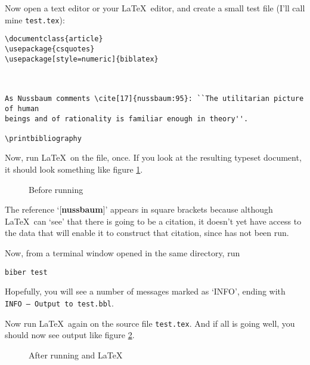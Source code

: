 Now open a text editor or your \LaTeX\ editor, and create a small test file (I'll call mine \texttt{test.tex}):

\begin{verbatim}
\documentclass{article}
\usepackage{csquotes}
\usepackage[style=numeric]{biblatex}



As Nussbaum comments \cite[17]{nussbaum:95}: ``The utilitarian picture of human
beings and of rationality is familiar enough in theory''.

\printbibliography

\end{verbatim}

Now, run \LaTeX\ on the file, once. If you look at the resulting typeset document, it should look something like figure \ref{nussbaum1}.

\begin{figure}
\caption{Before running }\label{nussbaum1}
\end{figure}

The reference `[\textbf{nussbaum}]' appears in square brackets because although \LaTeX\ can `see' that there is going to be a citation, it doesn't yet have access to the data that will enable it to construct that citation, since  has not been run.

Now, from a terminal window opened in the same directory, run
\begin{verbatim}
biber test
\end{verbatim}

Hopefully, you will see a number of messages marked as `INFO', ending with \texttt{INFO -- Output to test.bbl}.

Now run \LaTeX\ again on the source file \verb|test.tex|. And if all is going well, you should now see output like figure \ref{nussbaum2}.

\begin{figure}
\caption{After running  and \LaTeX}\label{nussbaum2}
\end{figure}

